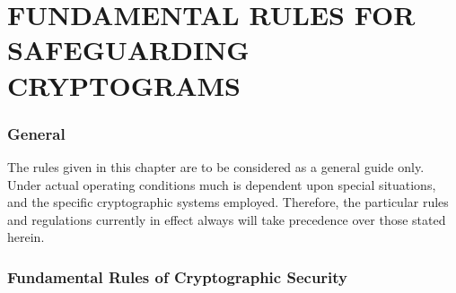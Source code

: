 \chapter{FUNDAMENTAL RULES FOR SAFEGUARDING CRYPTOGRAMS}

 

\subsection{General}

The rules given in this chapter are to be considered as a general guide
only. Under actual operating conditions much is dependent upon special
situations, and the speciﬁc cryptographic systems employed. Therefore,
the particular rules and regulations currently in effect always will take
precedence over those stated herein.

\subsection{Fundamental Rules of Cryptographic Security}

